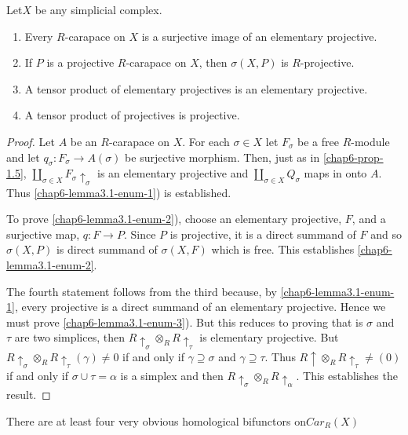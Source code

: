 \begin{seclem}\label{chap6-lemma-3.1}
Let\pageoriginale $X$ be any simplicial complex.
    \begin{enumerate}[(1)]
    \item Every $R$-carapace on $X$ is a surjective image of an elementary projective.\label{chap6-lemma3.1-enum-1}
    \item If $P$ is a projective $R$-carapace on $X$, then $\sigma(X, P)$ is $R$-projective.\label{chap6-lemma3.1-enum-2}
    \item A tensor product of elementary projectives is an elementary projective.\label{chap6-lemma3.1-enum-3}
    \item A tensor product of projectives is projective.\label{chap6-lemma3.1-enum-4}
    \end{enumerate}
\end{seclem}

\begin{proof}
Let $A$ be an $R$-carapace on $X$. For each $\sigma \in X$ let $F_{\sigma}$ be a free $R$-module and let $q_{\sigma} : F_{\sigma} \rightarrow A(\sigma)$ be surjective morphism. Then, just as in \ref{chap6-prop-1.5}, $\coprod_{\sigma \in X}F_{\sigma} \uparrow_{\sigma}$ is an elementary projective and $\coprod_{\sigma \in X}Q_{\sigma}$ maps in onto $A$. Thus \ref{chap6-lemma3.1-enum-1}) is established.

To prove \ref{chap6-lemma3.1-enum-2}), choose an elementary projective, $F$, and a surjective map, $q: F\rightarrow P$. Since $P$ is projective, it is a direct summand of $F$ and so $\sigma(X, P)$ is direct summand of $\sigma(X, F)$ which is free. This establishes \ref{chap6-lemma3.1-enum-2}.

The fourth statement follows from the third because, by \ref{chap6-lemma3.1-enum-1}, every projective is a direct summand of an elementary projective. Hence we must prove \ref{chap6-lemma3.1-enum-3}). But this reduces to proving that is $\sigma$ and $\tau$ are two simplices, then $R\uparrow_{\sigma} \otimes_{R}R \uparrow_{\tau}$ is elementary projective. But $R\uparrow_{\sigma}\otimes_{R}R\uparrow_{\tau}(\gamma) \neq 0$ if and only if $\gamma \supseteq \sigma$ and $\gamma \supseteq \tau$. Thus $R\uparrow \otimes_{R}R \uparrow_{\tau}\neq (0)$ if and only if $\sigma \cup \tau = \alpha$ is a simplex and then $R\uparrow_{\sigma}\otimes_{R}R \uparrow_{\alpha}$. This establishes the result. 
\end{proof}

There are at least four very obvious homological bifunctors on\break $C ar_{R}(X)$

